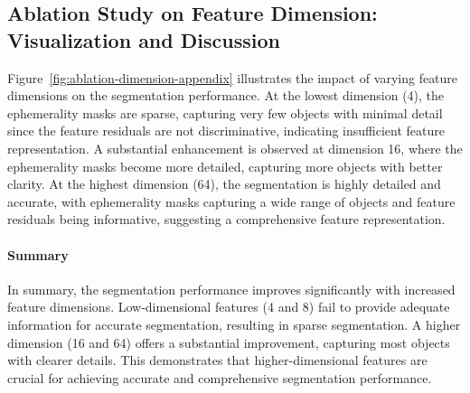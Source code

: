 \clearpage





\subsection{Ablation Study on Feature Dimension: Visualization and Discussion}

Figure~\ref{fig:ablation-dimension-appendix} illustrates the impact of varying feature dimensions on the segmentation performance. At the lowest dimension (4), the ephemerality masks are sparse, capturing very few objects with minimal detail since the feature residuals are not discriminative, indicating insufficient feature representation. A substantial enhancement is observed at dimension 16, where the ephemerality masks become more detailed, capturing more objects with better clarity. At the highest dimension (64), the segmentation is highly detailed and accurate, with ephemerality masks capturing a wide range of objects and feature residuals being informative, suggesting a comprehensive feature representation.

\paragraph{Summary} In summary, the segmentation performance improves significantly with increased feature dimensions. Low-dimensional features (4 and 8) fail to provide adequate information for accurate segmentation, resulting in sparse segmentation. A higher dimension (16 and 64) offers a substantial improvement, capturing most objects with clearer details. This demonstrates that higher-dimensional features are crucial for achieving accurate and comprehensive segmentation performance.

\vspace{5mm}

